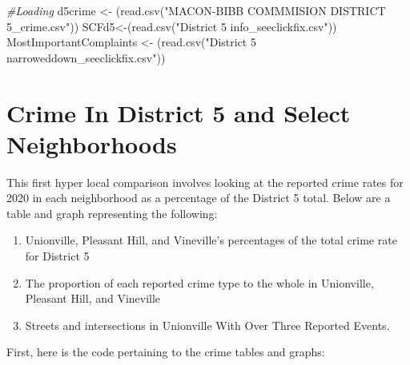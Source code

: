 \documentclass[
]{article}
\newenvironment{Shaded}{\begin{snugshade}}{\end{snugshade}}
\newcommand{\CommentTok}[1]{\textcolor[rgb]{0.56,0.35,0.01}{\textit{#1}}}
\newcommand{\FunctionTok}[1]{\textcolor[rgb]{0.00,0.00,0.00}{#1}}
\newcommand{\NormalTok}[1]{#1}
\newcommand{\OtherTok}[1]{\textcolor[rgb]{0.56,0.35,0.01}{#1}}
\newcommand{\StringTok}[1]{\textcolor[rgb]{0.31,0.60,0.02}{#1}}
\providecommand{\tightlist}{%
  \setlength{\itemsep}{0pt}\setlength{\parskip}{0pt}}
\begin{document}
\begin{Shaded}
\begin{Highlighting}[]
\CommentTok{\#Loading}
\NormalTok{d5crime }\OtherTok{\textless{}{-}}\NormalTok{ (}\FunctionTok{read.csv}\NormalTok{(}\StringTok{"MACON{-}BIBB COMMMISION DISTRICT 5\_crime.csv"}\NormalTok{))}
\NormalTok{SCFd5}\OtherTok{\textless{}{-}}\NormalTok{(}\FunctionTok{read.csv}\NormalTok{(}\StringTok{"District 5 info\_seeclickfix.csv"}\NormalTok{))}
\NormalTok{MostImportantComplaints }\OtherTok{\textless{}{-}}\NormalTok{ (}\FunctionTok{read.csv}\NormalTok{(}\StringTok{"District 5 narroweddown\_seeclickfix.csv"}\NormalTok{))}
\end{Highlighting}
\end{Shaded}

\hypertarget{crime-in-district-5-and-select-neighborhoods}{%
\section{Crime In District 5 and Select
Neighborhoods}\label{crime-in-district-5-and-select-neighborhoods}}

This first hyper local comparison involves looking at the reported crime
rates for 2020 in each neighborhood as a percentage of the District 5
total. Below are a table and graph representing the following:

\begin{enumerate}
\def\labelenumi{\arabic{enumi}.}
\tightlist
\item
  Unionville, Pleasant Hill, and Vineville's percentages of the total
  crime rate for District 5
\item
  The proportion of each reported crime type to the whole in Unionville,
  Pleasant Hill, and Vineville
\item
  Streets and intersections in Unionville With Over Three Reported
  Events.
\end{enumerate}

First, here is the code pertaining to the crime tables and graphs:
\end{document}
